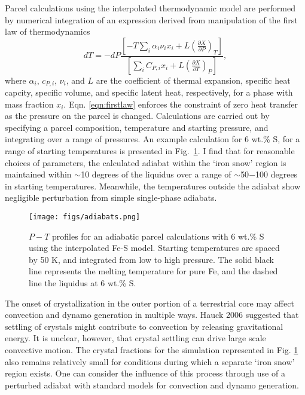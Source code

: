 Parcel calculations using the interpolated thermodynamic model are performed
by numerical integration of an expression derived from manipulation of the
first law of thermodynamics
\begin{equation}
  \label{eqn:firstlaw}
  d T = -d P \frac{\left[-T \sum_i \alpha_i\nu_ix_i +
    L\left(\frac{\partial{X}}{\partial{P}}\right)_T \right] } 
  {\left[ \sum_i C_{P,i}x_i + L \left(
    \frac{\partial{X}}{\partial{T}}\right)_P \right] },
\end{equation}
where $\alpha_i$, $c_{P,i}$, $\nu_i$, and $L$ are the coefficient of thermal
expansion, specific heat capcity, specific volume, and specific latent heat,
respectively, for a phase with mass fraction $x_i$. Eqn. \ref{eqn:firstlaw}
enforces the constraint of zero heat transfer as the pressure on the parcel is
changed. Calculations are carried out by specifying a parcel composition,
temperature and starting pressure, and integrating over a range of pressures.
An example calculation for 6 wt.\% S, for a range of starting temperatures is
presented in Fig.~\ref{fig:adiabats}. I find that for reasonable choices of
parameters, the calculated adiabat within the `iron snow' region is maintained
within $\sim$10 degrees of the liquidus over a range of $\sim$50$-$100 degrees
in starting temperatures. Meanwhile, the temperatures outside the adiabat show
negligible perturbation from simple single-phase adiabats.

 \begin{figure}[H] %
   \centering
   \texttt{[image: figs/adiabats.png]} 
   \caption{$P-T$ profiles for an adiabatic parcel calculations with 6 wt.\% S using the interpolated Fe-S model. Starting 
   temperatures are spaced by 50 K, and integrated from low to high pressure. The solid black line represents 
   the melting temperature for pure Fe, and the dashed line the liquidus at 6 wt.\% S.}
   \label{fig:adiabats}
\end{figure}

The onset of crystallization in the outer portion of a terrestrial core may
affect convection and dynamo generation in multiple ways. Hauck 2006
\cite{hauck06} suggested that settling of crystals might contribute to
convection by releasing gravitational energy. It is unclear, however, that
crystal settling can drive large scale convective motion. The crystal fractions
for the simulation represented in Fig. \ref{fig:adiabats} also remains
relatively small for conditions during which a separate `iron snow' region
exists. One can consider the influence of this process through use of a
perturbed adiabat with standard models for convection and dynamo generation.

